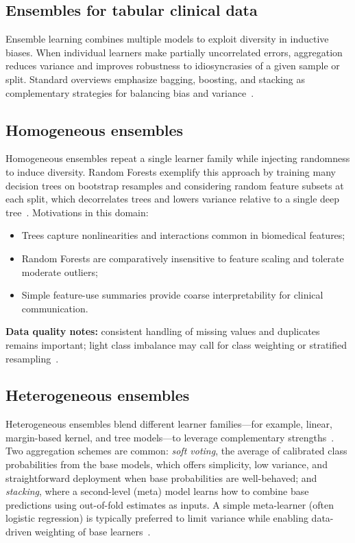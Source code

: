 \documentclass[conference]{IEEEtran}
\begin{document}
\subsection{Ensembles for tabular clinical data}
Ensemble learning combines multiple models to exploit diversity in inductive biases. When individual learners make partially uncorrelated errors, aggregation reduces variance and improves robustness to idiosyncrasies of a given sample or split. Standard overviews emphasize bagging, boosting, and stacking as complementary strategies for balancing bias and variance~\cite{kelleher2020fundamentals,zhou2012ensemble}.

\subsection{Homogeneous ensembles}
Homogeneous ensembles repeat a single learner family while injecting randomness to induce diversity. Random Forests exemplify this approach by training many decision trees on bootstrap resamples and considering random feature subsets at each split, which decorrelates trees and lowers variance relative to a single deep tree~\cite{breiman2001random}. Motivations in this domain:
\begin{itemize}
    \item Trees capture nonlinearities and interactions common in biomedical features;
    \item Random Forests are comparatively insensitive to feature scaling and tolerate moderate outliers;
    \item Simple feature-use summaries provide coarse interpretability for clinical communication.
\end{itemize}

\textbf{Data quality notes:} consistent handling of missing values and duplicates remains important; light class imbalance may call for class weighting or stratified resampling~\cite{kelleher2020fundamentals}.

\subsection{Heterogeneous ensembles}
Heterogeneous ensembles blend different learner families---for example, linear, margin-based kernel, and tree models---to leverage complementary strengths~\cite{wolpert1992stacked,kelleher2020fundamentals}. Two aggregation schemes are common:
\emph{soft voting}, the average of calibrated class probabilities from the base models, which offers simplicity, low variance, and straightforward deployment when base probabilities are well-behaved; and
\emph{stacking}, where a second-level (meta) model learns how to combine base predictions using out-of-fold estimates as inputs. A simple meta-learner (often logistic regression) is typically preferred to limit variance while enabling data-driven weighting of base learners~\cite{wolpert1992stacked,kelleher2020fundamentals}.
\end{document}
